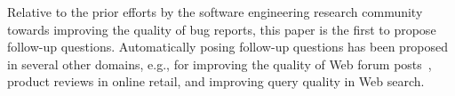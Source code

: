 Relative to the prior efforts by the software engineering research community towards improving the quality of bug reports, this paper is the first to propose follow-up questions. Automatically posing follow-up questions has been proposed in several other domains, e.g.,  for improving the quality of Web forum posts~\cite{rao-daume-iii-2018-learning}, product reviews in online retail, and improving query quality in Web search.

%
